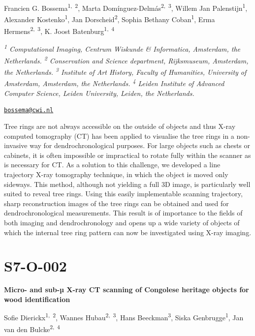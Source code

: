 \documentclass[
]{book}
\begin{document}
Francien G. Bossema\textsuperscript{1,~2}, Marta Domínguez-Delmás\textsuperscript{2,~3}, Willem Jan Palenstijn\textsuperscript{1}, Alexander Kostenko\textsuperscript{1}, Jan Dorscheid\textsuperscript{2}, Sophia Bethany Coban\textsuperscript{1}, Erma Hermens\textsuperscript{2,~3}, K. Joost Batenburg\textsuperscript{1,~4}

\emph{\textsuperscript{1} Computational Imaging, Centrum Wiskunde \& Informatica, Amsterdam, the Netherlands. \textsuperscript{2} Conservation and Science department, Rijksmuseum, Amsterdam, the Netherlands. \textsuperscript{3} Institute of Art History, Faculty of Humanities, University of Amsterdam, Amsterdam, the Netherlands. \textsuperscript{4} Leiden Institute of Advanced Computer Science, Leiden University, Leiden, the Netherlands.}

\href{mailto:bossema@cwi.nl}{\nolinkurl{bossema@cwi.nl}}

Tree rings are not always accessible on the outside of objects and thus X-ray computed tomography (CT) has been applied to visualise the tree rings in a non-invasive way for dendrochronological purposes. For large objects such as chests or cabinets, it is often impossible or impractical to rotate fully within the scanner as is necessary for CT. As a solution to this challenge, we developed a line trajectory X-ray tomography technique, in which the object is moved only sideways. This method, although not yielding a full 3D image, is particularly well suited to reveal tree rings. Using this easily implementable scanning trajectory, sharp reconstruction images of the tree rings can be obtained and used for dendrochronological measurements. This result is of importance to the fields of both imaging and dendrochronology and opens up a wide variety of objects of which the internal tree ring pattern can now be investigated using X-ray imaging.

\hypertarget{s7-o-002}{%
\section*{S7-O-002}\label{s7-o-002}}

\textbf{Micro- and sub-µ X-ray CT scanning of Congolese heritage objects for wood identification}

Sofie Dierickx\textsuperscript{1,~2}, Wannes Hubau\textsuperscript{2,~3}, Hans Beeckman\textsuperscript{3}, Siska Genbrugge\textsuperscript{1}, Jan van den Bulcke\textsuperscript{2,~4}
\end{document}
